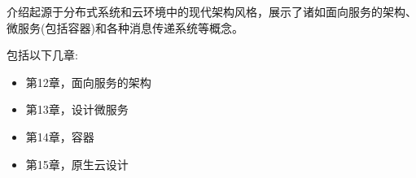 
介绍起源于分布式系统和云环境中的现代架构风格，展示了诸如面向服务的架构、微服务(包括容器)和各种消息传递系统等概念。

包括以下几章:

\begin{itemize}
\item 第12章，面向服务的架构
\item 第13章，设计微服务
\item 第14章，容器
\item 第15章，原生云设计
\end{itemize}
